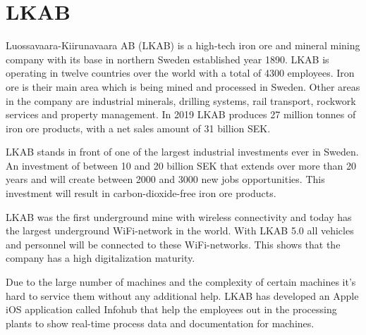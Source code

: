 \section{LKAB}
Luossavaara-Kiirunavaara AB (LKAB) is a high-tech iron ore and mineral mining company with its base in northern Sweden established year 1890.
LKAB is operating in twelve countries over the world with a total of 4300 employees.
Iron ore is their main area which is being mined and processed in Sweden.
Other areas in the company are industrial minerals, drilling systems, rail transport, rockwork services and property management.
In 2019 LKAB produces 27 million tonnes of iron ore products, with a net sales amount of 31 billion SEK. \cite{LKABBrief2021} 

\bigskip

LKAB stands in front of one of the largest industrial investments ever in Sweden.
An investment of between 10 and 20 billion SEK that extends over more than 20 years and will create between 2000 and 3000 new jobs opportunities.
This investment will result in carbon-dioxide-free iron ore products. \cite{LKABInvestment}

\bigskip

LKAB was the first underground mine with wireless connectivity and today has the largest underground WiFi-network in the world.
With LKAB 5.0 all vehicles and personnel will be connected to these WiFi-networks.
This shows that the company has a high digitalization maturity. \cite{LKABDigitalisation}

\bigskip

Due to the large number of machines and the complexity of certain machines it's hard to service them without any additional help.
LKAB has developed an Apple iOS application called Infohub that help the employees out in the processing plants to show real-time process data and documentation for machines.

